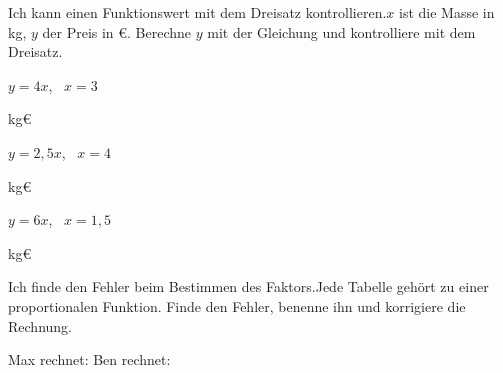 \begin{aufgabe}{Ich kann einen Funktionswert mit dem Dreisatz kontrollieren.\newline $x$ ist die Masse in kg, $y$ der Preis in €. Berechne $y$ mit der Gleichung und kontrolliere mit dem Dreisatz.}

\noindent\begin{minipage}[t]{0.32\linewidth}
\begin{teile}\teil $y = 4x$, \ $x = 3$\end{teile}
\begin{dreisatz}{kg}{€}
\end{dreisatz}
\end{minipage}\hfill
\begin{minipage}[t]{0.32\linewidth}
\begin{teile}\teil $y = 2{,}5x$, \ $x = 4$\end{teile}
\begin{dreisatz}{kg}{€}
\end{dreisatz}
\end{minipage}\hfill
\begin{minipage}[t]{0.32\linewidth}
\begin{teile}\teil $y = 6x$, \ $x = 1{,}5$\end{teile}
\begin{dreisatz}{kg}{€}
\end{dreisatz}
\end{minipage}
\end{aufgabe}


\begin{aufgabe}{Ich finde den Fehler beim Bestimmen des Faktors.\newline Jede Tabelle gehört zu einer proportionalen Funktion. Finde den Fehler, benenne ihn und korrigiere die Rechnung.}
\begin{teile}
\teil {} \quad Max rechnet:
\teil {} \quad Ben rechnet:
\end{teile}
\end{aufgabe}

